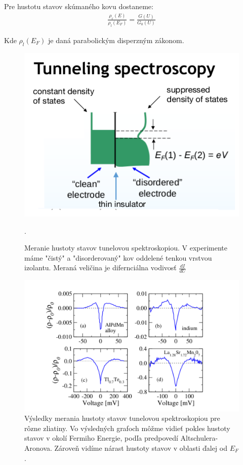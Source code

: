 Pre hustotu stavov skúmaného kovu dostaneme:
\begin{align}
\frac{\rho_r(E)}{\rho_l(E_F)} = \frac{G(U)}{G_0(U)}
\end{align}

Kde $\rho_l(E_F)$ je daná parabolickým disperzným zákonom.
\begin{figure}[H]
\centering
\includegraphics[scale=1]{grafy/DOS-cropped}
\caption{Meranie hustoty stavov tunelovou spektroskopiou. V experimente máme "čistý" a "disorderovaný" kov oddelené tenkou vrstvou izolantu. Meraná veličina je difernciálna vodivosť $\frac{d I}{d U}$}. 
\end{figure}
\begin{figure}[H]
\centering
\includegraphics[scale=1]{grafy/B2}
\caption{Výsledky merania hustoty stavov tunelovou spektroskopiou pre rôzne zliatiny. Vo výsledných grafoch môžme vidieť pokles hustoty stavov v okolí Fermiho Energie, podľa predpovedí Altschulera-Aronova. Zároveň vidíme  nárast hustoty stavov v oblasti ďalej od $E_F$.}
\end{figure}
